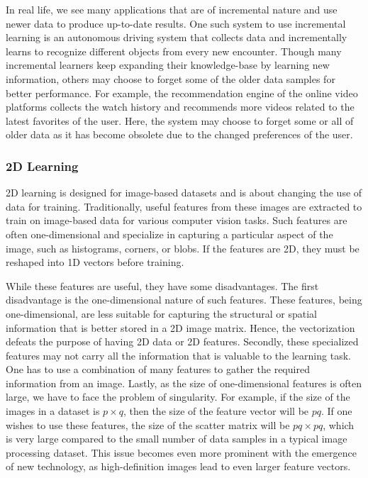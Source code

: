 In real life, we see many applications that are of incremental nature and use newer data to produce up-to-date results. One such system to use incremental learning is an autonomous driving system \cite{OliveiraSSDM16} that collects data and incrementally learns to recognize different objects from every new encounter. Though many incremental learners keep expanding their knowledge-base by learning new information, others may choose to forget some of the older data samples for better performance. For example, the recommendation engine \cite{ZhangYC19} of the online video platforms collects the watch history and recommends more videos related to the latest favorites of the user. Here, the system may choose to forget some or all of older data as it has become obsolete due to the changed preferences of the user.






\subsubsection*{2D Learning}
\label{ssubs:Intro_2D}
2D learning is designed for image-based datasets and is about changing the use of data for training. Traditionally, useful features from these images are extracted to train on image-based data for various computer vision tasks. Such features are often one-dimensional and specialize in capturing a particular aspect of the image, such as histograms, corners, or blobs. If the features are 2D, they must be reshaped into 1D vectors before training.

While these features are useful, they have some disadvantages. The first disadvantage is the one-dimensional nature of such features. These features, being one-dimensional, are less suitable for capturing the structural or spatial information that is better stored in a 2D image matrix. Hence, the vectorization defeats the purpose of having 2D data or 2D features. Secondly, these specialized features may not carry all the information that is valuable to the learning task. One has to use a combination of many features to gather the required information from an image. Lastly, as the size of one-dimensional features is often large, we have to face the problem of singularity. For example, if the size of the images in a dataset is $p \times q$, then the size of the feature vector will be $pq$. If one wishes to use these features, the size of the scatter matrix will be $pq \times pq$, which is very large compared to the small number of data samples in a typical image processing dataset. This issue becomes even more prominent with the emergence of new technology, as high-definition images lead to even larger feature vectors.

